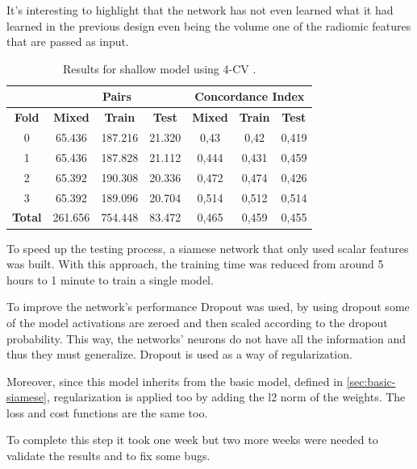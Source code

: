 It's interesting to highlight that the network has not even learned what it had learned in the 
previous design even being the volume one of the radiomic features
that are passed as input.

\begin{table}
  \centering
  \begin{tabular}{|c||c|c|c||c|c|c|}
    \cline{2-7}
    \multicolumn{1}{c|}{} & \multicolumn{3}{|c||}{\textbf{Pairs}} & 
    \multicolumn{3}{c|}{\textbf{Concordance Index}} \\
    \hline
    \textbf{Fold} & \textbf{Mixed} & \textbf{Train} & \textbf{Test} & 
    \textbf{Mixed} & \textbf{Train} & \textbf{Test} \\
    \hhline{=======}
    0 & 65.436 & 187.216 & 21.320 & 0,43 & 0,42 & 0,419 \\
    1 & 65.436 & 187.828 & 21.112 & 0,444 & 0,431 & 0,459 \\
    2 & 65.392 & 190.308 & 20.336 & 0,472 & 0,474 & 0,426 \\
    3 & 65.392 & 189.096 & 20.704 & 0,514 & 0,512 & 0,514 \\
    \hhline{=======}
    \textbf{Total} & 261.656 & 754.448 & 83.472 & 0,465 & 0,459 & 0,455 \\
    \hline
  \end{tabular}

  \caption[Shallow 4-CV results]{
    Results for shallow model using 4-CV \label{tab:results-shallow-4CV}.
  }
\end{table}

\label{sec:scalar-only}

To speed up the testing process, a siamese network that only used scalar features 
was built. With this approach, the training time was reduced from around 5 hours 
to 1 minute to train a single model. 

To improve the network's performance Dropout \cite{neural:dropout} was used, by using 
dropout some of the model activations are zeroed and then scaled according to the 
dropout probability. This way, the networks' neurons do not have all the information and 
thus they must generalize. Dropout is used as a way of regularization. 

Moreover, since this model inherits from the basic model, defined in \autoref{sec:basic-siamese}, 
regularization is applied too by adding the l2 norm of the weights. The loss and
cost functions are the same too.

To complete this step it took one week but two more weeks were needed to validate the results 
and to fix some bugs.


